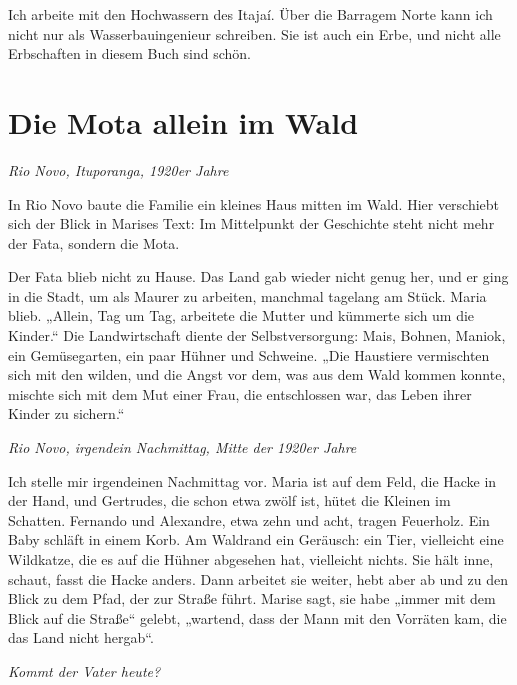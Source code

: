 \documentclass[
  ngerman,
  11pt,
  openany]{book}
\begin{document}
Ich arbeite mit den Hochwassern des Itajaí. Über die Barragem Norte kann
ich nicht nur als Wasserbauingenieur schreiben. Sie ist auch ein Erbe,
und nicht alle Erbschaften in diesem Buch sind schön.

\section{Die Mota allein im Wald}\label{die-mota-allein-im-wald}

\emph{Rio Novo, Ituporanga, 1920er Jahre}

In Rio Novo baute die Familie ein kleines Haus mitten im Wald. Hier
verschiebt sich der Blick in Marises Text: Im Mittelpunkt der Geschichte
steht nicht mehr der Fata, sondern die Mota.

Der Fata blieb nicht zu Hause. Das Land gab wieder nicht genug her, und
er ging in die Stadt, um als Maurer zu arbeiten, manchmal tagelang am
Stück. Maria blieb. „Allein, Tag um Tag, arbeitete die Mutter und
kümmerte sich um die Kinder.`` Die Landwirtschaft diente der
Selbstversorgung: Mais, Bohnen, Maniok, ein Gemüsegarten, ein paar
Hühner und Schweine. „Die Haustiere vermischten sich mit den wilden, und
die Angst vor dem, was aus dem Wald kommen konnte, mischte sich mit dem
Mut einer Frau, die entschlossen war, das Leben ihrer Kinder zu
sichern.``

\emph{Rio Novo, irgendein Nachmittag, Mitte der 1920er Jahre}

Ich stelle mir irgendeinen Nachmittag vor. Maria ist auf dem Feld, die
Hacke in der Hand, und Gertrudes, die schon etwa zwölf ist, hütet die
Kleinen im Schatten. Fernando und Alexandre, etwa zehn und acht, tragen
Feuerholz. Ein Baby schläft in einem Korb. Am Waldrand ein Geräusch: ein
Tier, vielleicht eine Wildkatze, die es auf die Hühner abgesehen hat,
vielleicht nichts. Sie hält inne, schaut, fasst die Hacke anders. Dann
arbeitet sie weiter, hebt aber ab und zu den Blick zu dem Pfad, der zur
Straße führt. Marise sagt, sie habe „immer mit dem Blick auf die
Straße`` gelebt, „wartend, dass der Mann mit den Vorräten kam, die das
Land nicht hergab``.

\emph{Kommt der Vater heute?}
\end{document}
